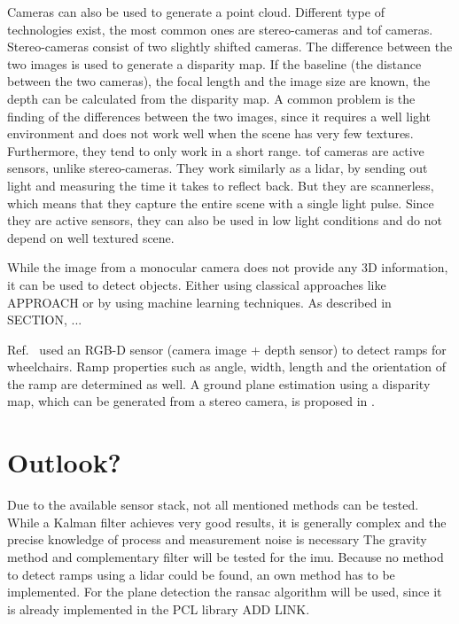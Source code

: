 Cameras can also be used to generate a point cloud.
Different type of technologies exist, the most common ones are stereo-cameras and \gls{tof} cameras.
Stereo-cameras consist of two slightly shifted cameras.
The difference between the two images is used to generate a disparity map.
If the baseline (the distance between the two cameras), the focal length and the image size are known, the depth can be calculated from the disparity map.
A common problem is the finding of the differences between the two images, since it requires a well light environment and does not work well when the scene has very few textures.
Furthermore, they tend to only work in a short range.
\gls{tof} cameras are active sensors, unlike stereo-cameras.
They work similarly as a \gls{lidar}, by sending out light and measuring the time it takes to reflect back.
But they are scannerless, which means that they capture the entire scene with a single light pulse.
Since they are active sensors, they can also be used in low light conditions and do not depend on well textured scene.\par
While the image from a monocular camera does not provide any 3D information, it can be used to detect objects.
Either using classical approaches like APPROACH or by using machine learning techniques.
As described in SECTION, ... \par
Ref.~\cite{Nejati2016} used an RGB-D sensor (camera image + depth sensor) to detect ramps for wheelchairs.
Ramp properties such as angle, width, length and the orientation of the ramp are determined as well.
A ground plane estimation using a disparity map, which can be generated from a stereo camera, is proposed in \cite{Chumerin2008}.\par



\section{Outlook?}
Due to the available sensor stack, not all mentioned methods can be tested.
While a Kalman filter achieves very good results, it is generally complex and the precise knowledge of process and measurement noise is necessary \cite{Higgins1975}
The gravity method and complementary filter will be tested for the \gls{imu}.
Because no method to detect ramps using a \gls{lidar} could be found, an own method has to be implemented.
For the plane detection the \gls{ransac} algorithm will be used, since it is already implemented in the PCL library ADD LINK.